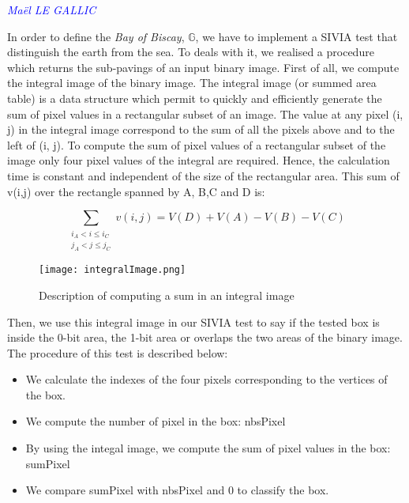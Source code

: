 \vspace{0.5 cm}
\textcolor{blue} {\textit{Maël LE GALLIC}}
\vspace{0.3 cm}

In order to define the \emph{Bay of Biscay}, $\mathbb{G}$, we have to implement a SIVIA test that distinguish the earth from the sea. To deals with it, we realised a procedure which returns the sub-pavings of an input binary image. 
First of all, we compute the integral image of the binary image. The integral image (or summed area table) is a data structure which permit to quickly and efficiently generate the sum of pixel values in a rectangular subset of an image. The value at any pixel (i, j) in the integral image correspond to the sum of all the pixels above and to the left of (i, j). To compute the sum of pixel values of a rectangular subset of the image only four pixel values of the integral are required. Hence, the calculation time is constant and independent of the size of the rectangular area. This sum of v(i,j) over the rectangle spanned by A, B,C and D is:

$$\sum_{\begin{smallmatrix} i_A < i \le i_C \\ j_A < j \le j_C \end{smallmatrix}} v(i,j) = V(D) + V(A) - V(B) - V(C)$$

\begin{figure}[!h] 
\center
\texttt{[image: integralImage.png]} 
\caption{Description of computing a sum in an integral image } 
\label{fig: Integral image}
\end{figure}

Then, we use this integral image in our SIVIA test to say if the tested box is inside the 0-bit area, the 1-bit area or overlaps the two areas of the binary image. The procedure of this test is described below:

\begin{itemize}
\item We calculate the indexes of the four pixels corresponding to the vertices of the box.
\item We compute the number of pixel in the box: nbsPixel
\item By using the integal image, we compute the sum of pixel values in the box: sumPixel
\item We compare sumPixel with nbsPixel and 0 to classify the box.
\end{itemize}

